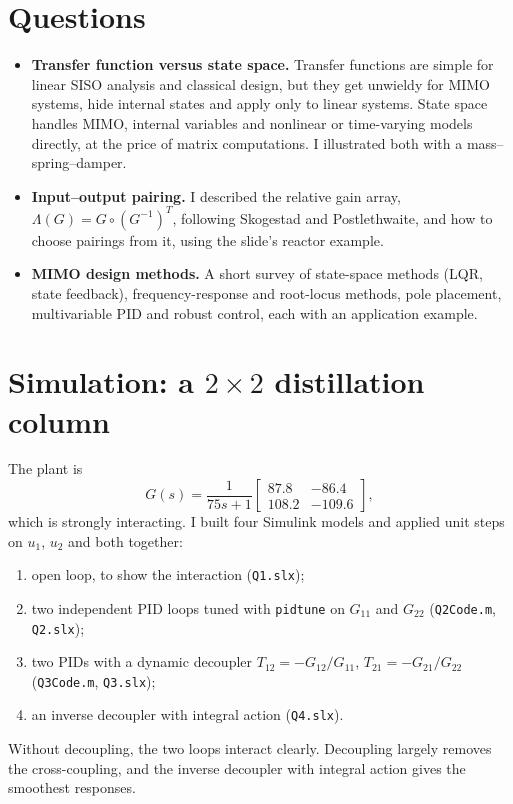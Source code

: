 


\section*{Questions}
\begin{itemize}
  \item \textbf{Transfer function versus state space.} Transfer functions are simple for linear SISO analysis and classical design, but they get unwieldy for MIMO systems, hide internal states and apply only to linear systems. State space handles MIMO, internal variables and nonlinear or time-varying models directly, at the price of matrix computations. I illustrated both with a mass--spring--damper.
  \item \textbf{Input--output pairing.} I described the relative gain array, $\Lambda(G)=G\circ(G^{-1})^T$, following Skogestad and Postlethwaite, and how to choose pairings from it, using the slide's reactor example.
  \item \textbf{MIMO design methods.} A short survey of state-space methods (LQR, state feedback), frequency-response and root-locus methods, pole placement, multivariable PID and robust control, each with an application example.
\end{itemize}

\section*{Simulation: a $2\times2$ distillation column}
The plant is
\[
G(s)=\frac{1}{75s+1}\begin{bmatrix}87.8 & -86.4\\ 108.2 & -109.6\end{bmatrix},
\]
which is strongly interacting. I built four Simulink models and applied unit steps on $u_1$, $u_2$ and both together:
\begin{enumerate}
  \item open loop, to show the interaction (\texttt{Q1.slx});
  \item two independent PID loops tuned with \texttt{pidtune} on $G_{11}$ and $G_{22}$ (\texttt{Q2Code.m}, \texttt{Q2.slx});
  \item two PIDs with a dynamic decoupler $T_{12}=-G_{12}/G_{11}$, $T_{21}=-G_{21}/G_{22}$ (\texttt{Q3Code.m}, \texttt{Q3.slx});
  \item an inverse decoupler with integral action (\texttt{Q4.slx}).
\end{enumerate}
Without decoupling, the two loops interact clearly. Decoupling largely removes the cross-coupling, and the inverse decoupler with integral action gives the smoothest responses.

